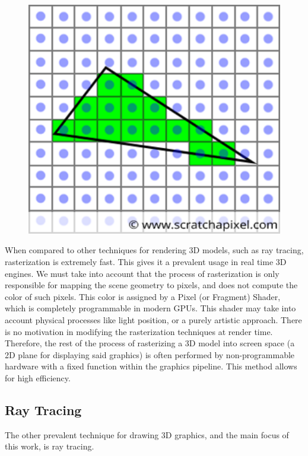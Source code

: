 \begin{figure}[hbt!]
    \centering
    \includegraphics[width=1.0\textwidth]{figuras/rasterization-triangle1.png}
    \caption{}
    \label{rasterization-triangle-image}
\end{figure}
When compared to other techniques for rendering 3D models, such as ray tracing, rasterization is extremely fast. This gives it a prevalent usage in real time 3D engines. We must take into account that the process of rasterization is only responsible for mapping the scene geometry to pixels, and does not compute the color of such pixels. This color is assigned by a Pixel (or Fragment) Shader, which is completely programmable in modern GPUs. This shader may take into account physical processes like light position, or a purely artistic approach. There is no motivation in modifying the rasterization techniques at render time. Therefore, the rest of the process of rasterizing a 3D model into screen space (a 2D plane for displaying said graphics) is often performed by non-programmable hardware with a fixed function within the graphics pipeline. This method allows for high efficiency.

\subsection{Ray Tracing}
The other prevalent technique for drawing 3D graphics, and the main focus of this work, is ray tracing.

